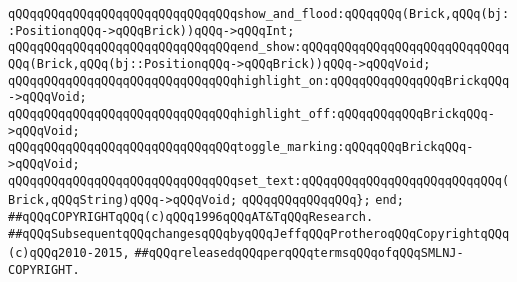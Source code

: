 \newline
\verb|qQQqqQQqqQQqqQQqqQQqqQQqqQQqqQQqshow_and_flood:qQQqqQQq(Brick,qQQq(bj::PositionqQQq->qQQqBrick))qQQq->qQQqInt;|\newline
\verb|qQQqqQQqqQQqqQQqqQQqqQQqqQQqqQQqend_show:qQQqqQQqqQQqqQQqqQQqqQQqqQQqqQQq(Brick,qQQq(bj::PositionqQQq->qQQqBrick))qQQq->qQQqVoid;|\newline
\newline
\verb|qQQqqQQqqQQqqQQqqQQqqQQqqQQqqQQqhighlight_on:qQQqqQQqqQQqqQQqBrickqQQq->qQQqVoid;|\newline
\verb|qQQqqQQqqQQqqQQqqQQqqQQqqQQqqQQqhighlight_off:qQQqqQQqqQQqBrickqQQq->qQQqVoid;|\newline
\verb|qQQqqQQqqQQqqQQqqQQqqQQqqQQqqQQqtoggle_marking:qQQqqQQqBrickqQQq->qQQqVoid;|\newline
\verb|qQQqqQQqqQQqqQQqqQQqqQQqqQQqqQQqset_text:qQQqqQQqqQQqqQQqqQQqqQQqqQQq(Brick,qQQqString)qQQq->qQQqVoid;|\newline
\verb|qQQqqQQqqQQqqQQq};|\newline
\newline
\verb|end;|\newline
\newline
\verb|##qQQqCOPYRIGHTqQQq(c)qQQq1996qQQqAT&TqQQqResearch.|\newline
\verb|##qQQqSubsequentqQQqchangesqQQqbyqQQqJeffqQQqProtheroqQQqCopyrightqQQq(c)qQQq2010-2015,|\newline
\verb|##qQQqreleasedqQQqperqQQqtermsqQQqofqQQqSMLNJ-COPYRIGHT.|\newline

